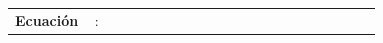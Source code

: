 \begin{exerciseEVAU}
\begin{solu}
        \begin{table}[H]
            \begin{tabular}{@{}C{0.21\linewidth} @{\,}c@{\,} C{0.21\linewidth} @{\,}c@{\,} C{0.21\linewidth} @{\,}c@{\,} C{0.21\linewidth}@{}}
                \toprule
                \textbf{Ecuación} & : & \textbf{} & \ch{->} & \textbf{} & \ch{+} & \textbf{} \\

\end{tabular}
\end{table}
\end{solu}
\end{exerciseEVAU}
